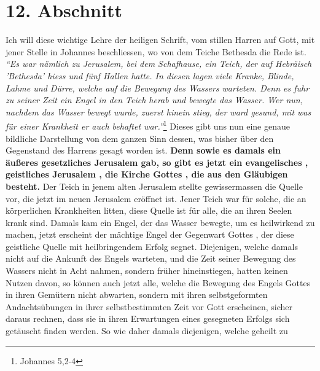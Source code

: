\section{12. Abschnitt} \label{kap6_ab12}

\label{ref:06_12_wahre_kirche}
Ich will diese wichtige Lehre der heiligen Schrift, vom stillen Harren auf Gott,
mit jener Stelle in Johannes beschliessen, wo von dem Teiche Bethesda
die Rede ist.
\textit{"`Es war nämlich zu Jerusalem, bei dem Schafhause, ein Teich, der
auf Hebräisch 'Bethesda' hiess und fünf Hallen hatte. In diesen lagen viele
Kranke, Blinde, Lahme und Dürre, welche auf die Bewegung des Wassers warteten.
Denn es fuhr zu seiner Zeit ein Engel in den Teich herab und bewegte das
Wasser. Wer nun, nachdem das Wasser bewegt wurde, zuerst hinein stieg, der ward
gesund, mit was für einer Krankheit er auch behaftet war."'}\footnote{Johannes
5,2-4}
Dieses gibt uns nun eine genaue bildliche Darstellung von dem ganzen Sinn
dessen, was bisher über den Gegenstand des Harrens gesagt worden ist.
\textbf{Denn sowie
es damals ein äußeres gesetzliches Jerusalem
gab, so gibt es jetzt ein
evangelisches , geistliches Jerusalem
, die Kirche Gottes , die aus
den Gläubigen  
besteht.} Der Teich in jenem alten Jerusalem 
stellte gewissermassen die Quelle
vor, die jetzt im neuen Jerusalem  eröffnet ist.
Jener Teich war für solche, die
an körperlichen Krankheiten litten, diese Quelle ist für alle, die an ihren
Seelen krank sind. Damals kam ein Engel, der das Wasser bewegte, um es
heilwirkend zu machen, jetzt erscheint der mächtige Engel
 der
Gegenwart Gottes ,
der diese geistliche Quelle  mit heilbringendem Erfolg
segnet. Diejenigen,
welche damals nicht auf die Ankunft des Engels warteten, und die Zeit seiner
Bewegung des Wassers nicht in Acht nahmen, sondern früher hineinstiegen, hatten
keinen Nutzen davon, so können auch jetzt alle, welche die Bewegung des Engels
Gottes in ihren Gemütern nicht abwarten, sondern mit ihren selbstgeformten
Andachtsübungen in ihrer selbstbestimmten Zeit vor Gott erscheinen, sicher
daraus rechnen, dass sie in ihren Erwartungen eines gesegneten Erfolgs sich
getäuscht finden werden. So wie daher damals diejenigen, welche geheilt zu
